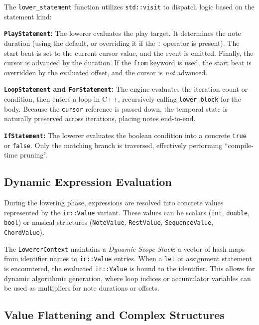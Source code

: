 The \texttt{lower\_statement} function utilizes \texttt{std::visit} to dispatch logic based on the statement kind:

\noindent \textbf{\texttt{PlayStatement}:} The lowerer evaluates the play target.
It determines the note duration (using the default, or overriding it if the \texttt{:} operator is present).
The start beat is set to the current cursor value, and the event is emitted.
Finally, the cursor is advanced by the duration.
If the \texttt{from} keyword is used, the start beat is overridden by the evaluated offset, and the cursor is
\textit{not} advanced.

\noindent \textbf{\texttt{LoopStatement} and \texttt{ForStatement}:} The engine evaluates the iteration count or
condition, then enters a loop in C++, recursively calling \texttt{lower\_block} for the body.
Because the \texttt{cursor} reference is passed down, the temporal state is naturally preserved across iterations,
placing notes end-to-end.

\noindent \textbf{\texttt{IfStatement}:} The lowerer evaluates the boolean condition into a concrete \texttt{true} or
\texttt{false}.
Only the matching branch is traversed, effectively performing ``compile-time pruning''.

\subsection{Dynamic Expression Evaluation}\label{detail-subsec:dynamic-expression-evaluation}

During the lowering phase, expressions are resolved into concrete values represented by the \texttt{ir::Value} variant.
These values can be scalars (\texttt{int}, \texttt{double}, \texttt{bool}) or musical structures (\texttt{NoteValue},
\texttt{RestValue}, \texttt{SequenceValue}, \texttt{ChordValue}).

The \texttt{LowererContext} maintains a \textit{Dynamic Scope Stack}: a vector of hash maps from identifier names to
\texttt{ir::Value} entries.
When a \texttt{let} or assignment statement is encountered, the evaluated \texttt{ir::Value} is bound to the identifier.
This allows for dynamic algorithmic generation, where loop indices or accumulator variables can be used as multipliers
for note durations or offsets.

\subsection{Value Flattening and Complex Structures}\label{detail-subsec:value-flattening-and-complex-structures}


